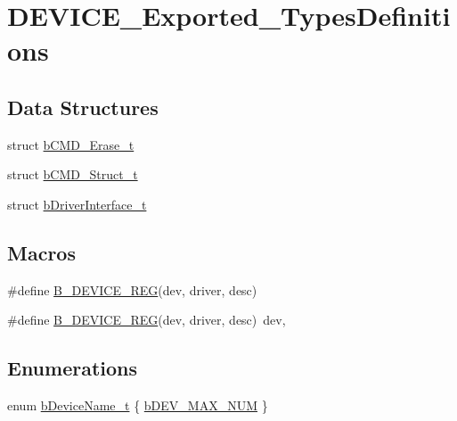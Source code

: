 \hypertarget{group___d_e_v_i_c_e___exported___types_definitions}{}\section{D\+E\+V\+I\+C\+E\+\_\+\+Exported\+\_\+\+Types\+Definitions}
\label{group___d_e_v_i_c_e___exported___types_definitions}
\subsection*{Data Structures}
\begin{DoxyCompactItemize}
\item 
struct \mbox{\hyperlink{structb_c_m_d___erase__t}{b\+C\+M\+D\+\_\+\+Erase\+\_\+t}}
\item 
struct \mbox{\hyperlink{structb_c_m_d___struct__t}{b\+C\+M\+D\+\_\+\+Struct\+\_\+t}}
\item 
struct \mbox{\hyperlink{structb_driver_interface__t}{b\+Driver\+Interface\+\_\+t}}
\end{DoxyCompactItemize}
\subsection*{Macros}
\begin{DoxyCompactItemize}
\item 
\#define \mbox{\hyperlink{group___d_e_v_i_c_e___exported___types_definitions_gac84c032de111b645587293ce1373b668}{B\+\_\+\+D\+E\+V\+I\+C\+E\+\_\+\+R\+EG}}(dev,  driver,  desc)
\item 
\#define \mbox{\hyperlink{group___d_e_v_i_c_e___exported___types_definitions_gac84c032de111b645587293ce1373b668}{B\+\_\+\+D\+E\+V\+I\+C\+E\+\_\+\+R\+EG}}(dev,  driver,  desc)~dev,
\end{DoxyCompactItemize}
\subsection*{Enumerations}
\begin{DoxyCompactItemize}
\item 
enum \mbox{\hyperlink{group___d_e_v_i_c_e___exported___types_definitions_ga1793ffbad2239c36ab43090841cf9fda}{b\+Device\+Name\+\_\+t}} \{ \mbox{\hyperlink{group___d_e_v_i_c_e___exported___types_definitions_gga1793ffbad2239c36ab43090841cf9fdaab886891c64c883dc4b308e9b165fa571}{b\+D\+E\+V\+\_\+\+M\+A\+X\+\_\+\+N\+UM}}
 \}
\end{DoxyCompactItemize}


